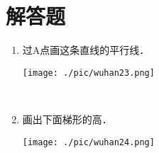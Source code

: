 \documentclass[12pt,twoside,space]{ctexart}
\begin{document}
    \section{解答题}
          \begin{enumerate}[itemsep=-0.3em,topsep=0pt,resume]
            \item 过A点画这条直线的平行线．\\[0.5em]
              \begin{minipage}{\textwidth}
                \texttt{[image: ./pic/wuhan23.png]}
              \end{minipage} \\[0.5em]

            \item 画出下面梯形的高．\\[0.5em]
              \begin{minipage}{\textwidth}
                \texttt{[image: ./pic/wuhan24.png]}
              \end{minipage}\\[0.5em]
            \end{enumerate}
\end{document}
